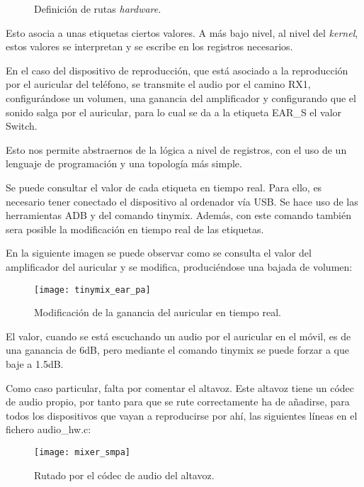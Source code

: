 \begin{figure}[H]
	\centering
	\caption{Definición de rutas \textit{hardware}.} \label{fig:definicion_rutas_mixer}
\end{figure}

Esto asocia a unas etiquetas ciertos valores. A más bajo nivel, al nivel del \textit{kernel}, estos valores se interpretan y se escribe en los registros necesarios.

En el caso del dispositivo de reproducción, que está asociado a la reproducción por el auricular del teléfono, se transmite el audio por el camino RX1, configurándose un volumen, una ganancia del amplificador y configurando que el sonido salga por el auricular, para lo cual se da a la etiqueta EAR\_S el valor Switch.

Esto nos permite abstraernos de la lógica a nivel de registros, con el uso de un lenguaje de programación y una topología más simple.

Se puede consultar el valor de cada etiqueta en tiempo real. Para ello, es necesario tener conectado el dispositivo al ordenador vía \gls{USB}. Se hace uso de las herramientas \gls{ADB} y del comando tinymix. Además, con este comando también sera posible la modificación en tiempo real de las etiquetas.

En la siguiente imagen se puede observar como se consulta el valor del amplificador del auricular y se modifica, produciéndose una bajada de volumen:

\begin{figure}[H]
	\centering
	\texttt{[image: tinymix\_ear\_pa]}
	\caption{Modificación de la ganancia del auricular en tiempo real.} 
	\label{fig:tinymix_ear_pa}
\end{figure}

El valor, cuando se está escuchando un audio por el auricular en el móvil, es de una ganancia de 6\gls{dB}, pero mediante el comando tinymix se puede forzar a que baje a 1.5\gls{dB}.

Como caso particular, falta por comentar el altavoz. Este altavoz tiene un códec de audio propio, por tanto para que se rute correctamente ha de añadirse, para todos los dispositivos que vayan a reproducirse por ahí, las siguientes líneas en el fichero audio\_hw.c:

\begin{figure}[H]
	\centering
	\texttt{[image: mixer\_smpa]}
	\caption{Rutado por el códec de audio del altavoz.} 
	\label{fig:mixer_smpa}
\end{figure}

